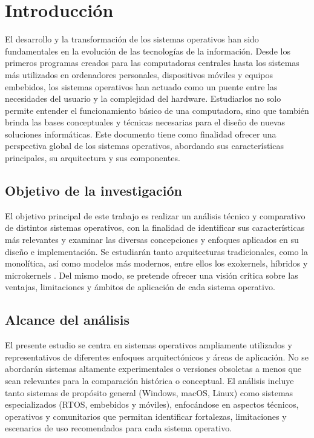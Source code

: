 \chapter*{Introducción}
{}

El desarrollo y la transformación de los sistemas operativos han sido fundamentales en la evolución de las tecnologías de la información. Desde los primeros programas creados para las computadoras centrales hasta los sistemas más utilizados en ordenadores personales, dispositivos móviles y equipos embebidos, los sistemas operativos han actuado como un puente entre las necesidades del usuario y la complejidad del hardware. Estudiarlos no solo permite entender el funcionamiento básico de una computadora, sino que también brinda las bases conceptuales y técnicas necesarias para el diseño de nuevas soluciones informáticas. Este documento tiene como finalidad ofrecer una perspectiva global de los sistemas operativos, abordando sus características principales, su arquitectura y sus componentes.

\section*{Objetivo de la investigación}
{}

El objetivo principal de este trabajo es realizar un análisis técnico y comparativo de distintos sistemas operativos, con la finalidad de identificar sus características más relevantes y examinar las diversas concepciones y enfoques aplicados en su diseño e implementación. Se estudiarán tanto arquitecturas tradicionales, como la monolítica, así como modelos más modernos, entre ellos los exokernels, híbridos y microkernels . Del mismo modo, se pretende ofrecer una visión crítica sobre las ventajas, limitaciones y ámbitos de aplicación de cada sistema operativo.

\section*{Alcance del análisis}
{}
El presente estudio se centra en sistemas operativos ampliamente utilizados y representativos de diferentes enfoques arquitectónicos y áreas de aplicación. No se abordarán sistemas altamente experimentales o versiones obsoletas a menos que sean relevantes para la comparación histórica o conceptual. El análisis incluye tanto sistemas de propósito general (Windows, macOS, Linux) como sistemas especializados (RTOS, embebidos y móviles), enfocándose en aspectos técnicos, operativos y comunitarios que permitan identificar fortalezas, limitaciones y escenarios de uso recomendados para cada sistema operativo.

